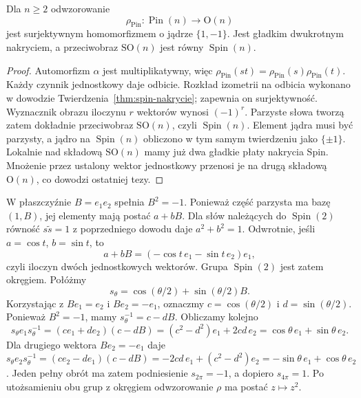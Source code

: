 \begin{wniosek}
\label{cor:pin-nakrycie}
Dla $n\geq2$ odwzorowanie
\[
 \rho_{\mathrm{Pin}}:\operatorname{Pin}(n)\longrightarrow
 \mathrm O(n)
\]
jest surjektywnym homomorfizmem o jądrze $\{1,-1\}$.
Jest gładkim dwukrotnym nakryciem, a przeciwobraz
$\mathrm{SO}(n)$ jest równy $\operatorname{Spin}(n)$.
\end{wniosek}
\begin{proof}
Automorfizm $\alpha$ jest multiplikatywny, więc
$\rho_{\mathrm{Pin}}(st)=\rho_{\mathrm{Pin}}(s)
\rho_{\mathrm{Pin}}(t)$. Każdy czynnik jednostkowy
daje odbicie. Rozkład izometrii na odbicia wykonano
w dowodzie Twierdzenia~\ref{thm:spin-nakrycie}; zapewnia
on surjektywność. Wyznacznik obrazu iloczynu $r$
wektorów wynosi $(-1)^r$. Parzyste słowa tworzą
zatem dokładnie przeciwobraz $\mathrm{SO}(n)$, czyli
$\operatorname{Spin}(n)$. Element jądra musi być parzysty,
a jądro na $\operatorname{Spin}(n)$ obliczono w tym samym
twierdzeniu jako $\{\pm1\}$. Lokalnie nad składową
$\mathrm{SO}(n)$ mamy już dwa gładkie płaty nakrycia Spin.
Mnożenie przez ustalony wektor jednostkowy przenosi je
na drugą składową $\mathrm O(n)$, co dowodzi ostatniej tezy.
\end{proof}

\begin{przyklad}
\label{prz:spin2}
W płaszczyźnie $B=e_1e_2$ spełnia $B^2=-1$.
Ponieważ część parzysta ma bazę $(1,B)$,
jej elementy mają postać $a+bB$. Dla słów
należących do $\operatorname{Spin}(2)$ równość
$s\widetilde s=1$ z poprzedniego dowodu daje
$a^2+b^2=1$. Odwrotnie, jeśli
$a=\cos t$, $b=\sin t$, to
\[
 a+bB=(-\cos t\,e_1-\sin t\,e_2)e_1,
\]
czyli iloczyn dwóch jednostkowych wektorów.
Grupa $\operatorname{Spin}(2)$ jest zatem okręgiem.
Połóżmy
\[
 s_\theta=\cos(\theta/2)+\sin(\theta/2)B.
\]
Korzystając z $Be_1=e_2$ i $Be_2=-e_1$,
oznaczmy $c=\cos(\theta/2)$ i $d=\sin(\theta/2)$.
Ponieważ $B^2=-1$, mamy $s_\theta^{-1}=c-dB$.
Obliczamy kolejno
\[
 s_\theta e_1s_\theta^{-1}
 =(ce_1+de_2)(c-dB)
 =(c^2-d^2)e_1+2cd\,e_2
 =\cos\theta\,e_1+\sin\theta\,e_2.
\]
Dla drugiego wektora $Be_2=-e_1$ daje
$s_\theta e_2s_\theta^{-1}
=(ce_2-de_1)(c-dB)
=-2cd\,e_1+(c^2-d^2)e_2
=-\sin\theta\,e_1+\cos\theta\,e_2$.
Jeden pełny obrót ma zatem podniesienie
$s_{2\pi}=-1$, a dopiero $s_{4\pi}=1$.
Po utożsamieniu obu grup z okręgiem odwzorowanie
$\rho$ ma postać $z\mapsto z^2$.
\end{przyklad}

